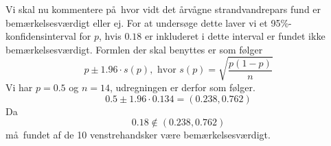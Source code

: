 {
Vi skal nu kommentere p\aa\ hvor vidt det \aa rv\aa gne strandvandrepars fund er bem\ae rkelsesv\ae rdigt eller ej. For at unders\o ge dette laver vi et 95\%-konfidensinterval for $p$, hvis $0.18$ er inkluderet i dette interval er fundet ikke bem\ae rkelsesv\ae rdigt. Formlen der skal benyttes er som f\o lger
\[
p \pm 1.96 \cdot s(p), \textrm{ hvor } s(p) = \sqrt{\frac{p(1-p)}{n}}
\]
Vi har $p = 0.5$ og $n = 14$, udregningen er derfor som f\o lger.
\[
0.5 \pm 1.96 \cdot 0.134 = (0.238,0.762)
\]
Da
\[
0.18 \notin (0.238,0.762)
\]
m\aa\ fundet af de 10 venstrehandsker v\ae re bem\ae rkelsesv\ae rdigt.
}
